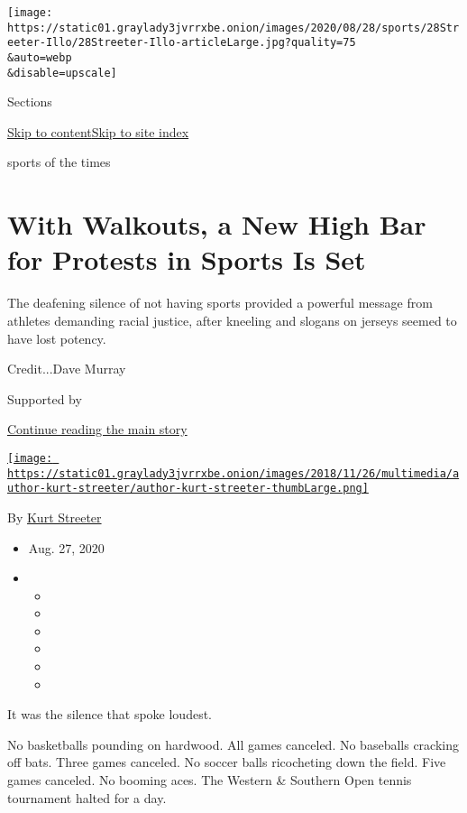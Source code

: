 \texttt{[image: https://static01.graylady3jvrrxbe.onion/images/2020/08/28/sports/28Streeter-Illo/28Streeter-Illo-articleLarge.jpg?quality=75\\\&auto=webp\\\&disable=upscale]}

Sections

\protect\hyperlink{site-content}{Skip to
content}\protect\hyperlink{site-index}{Skip to site index}

sports of the times

\hypertarget{with-walkouts-a-new-high-bar-for-protests-in-sports-is-set}{%
\section{With Walkouts, a New High Bar for Protests in Sports Is
Set}\label{with-walkouts-a-new-high-bar-for-protests-in-sports-is-set}}

The deafening silence of not having sports provided a powerful message
from athletes demanding racial justice, after kneeling and slogans on
jerseys seemed to have lost potency.

Credit...Dave Murray

Supported by

\protect\hyperlink{after-sponsor}{Continue reading the main story}

\href{https://www.nytimes3xbfgragh.onion/by/kurt-streeter}{\texttt{[image: https://static01.graylady3jvrrxbe.onion/images/2018/11/26/multimedia/author-kurt-streeter/author-kurt-streeter-thumbLarge.png]}}

By \href{https://www.nytimes3xbfgragh.onion/by/kurt-streeter}{Kurt
Streeter}

\begin{itemize}
\item
  Aug. 27, 2020
\item
  \begin{itemize}
  \item
  \item
  \item
  \item
  \item
  \item
  \end{itemize}
\end{itemize}

It was the silence that spoke loudest.

No basketballs pounding on hardwood. All games canceled. No baseballs
cracking off bats. Three games canceled. No soccer balls ricocheting
down the field. Five games canceled. No booming aces. The Western \&
Southern Open tennis tournament halted for a day.

